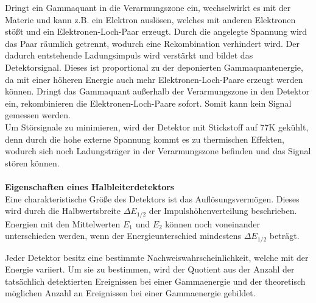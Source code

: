 Dringt ein Gammaquant in die Verarmungszone ein, wechselwirkt es mit der Materie und kann
z.B. ein Elektron auslösen, welches mit anderen Elektronen stößt und ein Elektronen-Loch-Paar erzeugt.
Durch die angelegte Spannung wird das Paar räumlich getrennt, wodurch eine Rekombination verhindert wird.
Der dadurch entstehende Ladungsimpuls
wird verstärkt und bildet das Detektorsignal. Dieses ist proportional zu der deponierten Gammaquantenergie, da mit
einer höheren Energie auch mehr Elektronen-Loch-Paare erzeugt werden können.
Dringt das Gammaquant außerhalb der Verarmungszone in den Detektor ein, rekombinieren die
Elektronen-Loch-Paare sofort. Somit kann kein Signal gemessen werden.\\
Um Störsignale zu minimieren, wird der Detektor mit Stickstoff auf 77\;K gekühlt, denn durch die
hohe externe Spannung kommt es zu thermischen Effekten, wodurch sich noch Ladungsträger in der Verarmungszone
befinden und das Signal stören können.
\\
\\
\textbf{Eigenschaften eines Halbleiterdetektors}\\
Eine charakteristische Größe des Detektors ist das Auflösungsvermögen. Dieses wird durch die
Halbwertsbreite $\Delta E_{1/2}$ der Impulshöhenverteilung beschrieben. Energien mit den Mittelwerten
$E_1$ und $E_2$ können noch voneinander unterschieden werden, wenn der Energieunterschied mindestens
$\Delta E_{1/2}$ beträgt.

Jeder Detektor besitz eine bestimmte Nachweiswahrscheinlichkeit, welche mit der Energie variiert.
Um sie zu bestimmen, wird der Quotient aus der Anzahl der tatsächlich detektierten Ereignissen bei einer Gammaenergie
und der theoretisch möglichen Anzahl an Ereignissen bei einer Gammaenergie gebildet.


